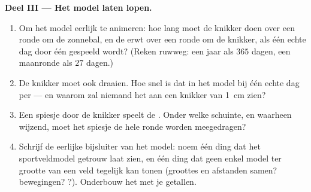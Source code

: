 \begin{problem}
\medskip\noindent\textbf{Deel III --- Het model laten lopen.}
\begin{enumerate}[resume]
  \item Om het model eerlijk te animeren: hoe lang moet de knikker
        doen over een ronde om de zonnebal, en de erwt over een
        ronde om de knikker, als één echte dag door één 
        gespeeld wordt? (Reken ruwweg: een jaar als $365$ dagen, een
        maanronde als $27$ dagen.)
  \item De knikker moet ook draaien. Hoe snel is dat in het model
        bij één echte dag per  --- en waarom zal niemand het
        aan een knikker van \qty{1}{cm} zien?
  \item Een spiesje door de knikker speelt de . Onder welke
        schuinte, en waarheen wijzend, moet het spiesje de hele ronde
        worden meegedragen?
  \item Schrijf de eerlijke bijsluiter van het model: noem één ding
        dat het sportveldmodel getrouw laat zien, en één ding dat
        geen enkel model ter grootte van een veld tegelijk kan tonen
        (groottes en afstanden samen? bewegingen? ?). Onderbouw
        het met je getallen.
\end{enumerate}
\end{problem}
